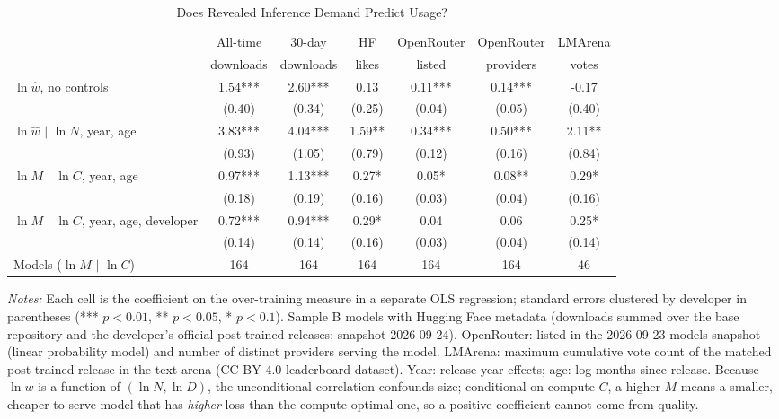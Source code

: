 \begin{table}[htbp]
\centering
\scriptsize
\begin{threeparttable}
\caption{Does Revealed Inference Demand Predict Usage?}
\label{tab:m3_validation}
\begin{tabular}{@{}lcccccc@{}}
\toprule
 & All-time & 30-day & HF & OpenRouter & OpenRouter & LMArena \\
 & downloads & downloads & likes & listed & providers & votes \\
\midrule
$\ln\hat w$, no controls & 1.54*** & 2.60*** & 0.13 & 0.11*** & 0.14*** & -0.17 \\
 & (0.40) & (0.34) & (0.25) & (0.04) & (0.05) & (0.40) \\
$\ln\hat w$ $|$ $\ln N$, year, age & 3.83*** & 4.04*** & 1.59** & 0.34*** & 0.50*** & 2.11** \\
 & (0.93) & (1.05) & (0.79) & (0.12) & (0.16) & (0.84) \\
$\ln M$ $|$ $\ln C$, year, age & 0.97*** & 1.13*** & 0.27* & 0.05* & 0.08** & 0.29* \\
 & (0.18) & (0.19) & (0.16) & (0.03) & (0.04) & (0.16) \\
$\ln M$ $|$ $\ln C$, year, age, developer & 0.72*** & 0.94*** & 0.29* & 0.04 & 0.06 & 0.25* \\
 & (0.14) & (0.14) & (0.16) & (0.03) & (0.04) & (0.14) \\
\midrule
Models ($\ln M$ $|$ $\ln C$) & 164 & 164 & 164 & 164 & 164 & 46 \\
\bottomrule
\end{tabular}
\begin{tablenotes}\footnotesize
\item \textit{Notes:} Each cell is the coefficient on the over-training measure in a separate OLS regression; standard errors clustered by developer in parentheses (*** $p<0.01$, ** $p<0.05$, * $p<0.1$). Sample B models with Hugging Face metadata (downloads summed over the base repository and the developer's official post-trained releases; snapshot 2026-09-24). OpenRouter: listed in the 2026-09-23 models snapshot (linear probability model) and number of distinct providers serving the model. LMArena: maximum cumulative vote count of the matched post-trained release in the text arena (CC-BY-4.0 leaderboard dataset). Year: release-year effects; age: log months since release. Because $\ln w$ is a function of $(\ln N,\ln D)$, the unconditional correlation confounds size; conditional on compute $C$, a higher $M$ means a smaller, cheaper-to-serve model that has \emph{higher} loss than the compute-optimal one, so a positive coefficient cannot come from quality.
\end{tablenotes}
\end{threeparttable}
\end{table}
